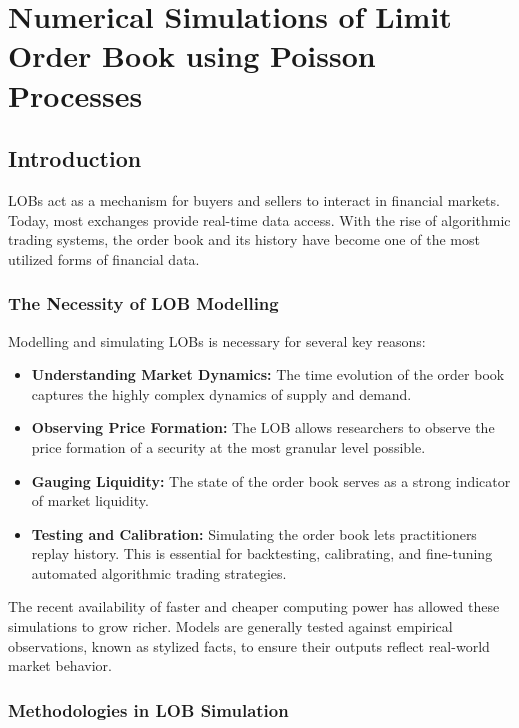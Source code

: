 \chapter{Numerical Simulations of Limit Order Book using Poisson Processes}

\section{Introduction}
LOBs act as a mechanism for buyers and sellers to interact in financial markets. Today, most exchanges provide real-time data access. With the rise of algorithmic trading systems, the order book and its history have become one of the most utilized forms of financial data. 

\subsection*{The Necessity of LOB Modelling}

Modelling and simulating LOBs is necessary for several key reasons:

\begin{itemize}
    \item \textbf{Understanding Market Dynamics:} The time evolution of the order book captures the highly complex dynamics of supply and demand. 
    \item \textbf{Observing Price Formation:} The LOB allows researchers to observe the price formation of a security at the most granular level possible.
    \item \textbf{Gauging Liquidity:} The state of the order book serves as a strong indicator of market liquidity.
    \item \textbf{Testing and Calibration:} Simulating the order book lets practitioners replay history. This is essential for backtesting, calibrating, and fine-tuning automated algorithmic trading strategies.
\end{itemize}

The recent availability of faster and cheaper computing power has allowed these simulations to grow richer. Models are generally tested against empirical observations, known as stylized facts, to ensure their outputs reflect real-world market behavior. 

\subsection*{Methodologies in LOB Simulation}

